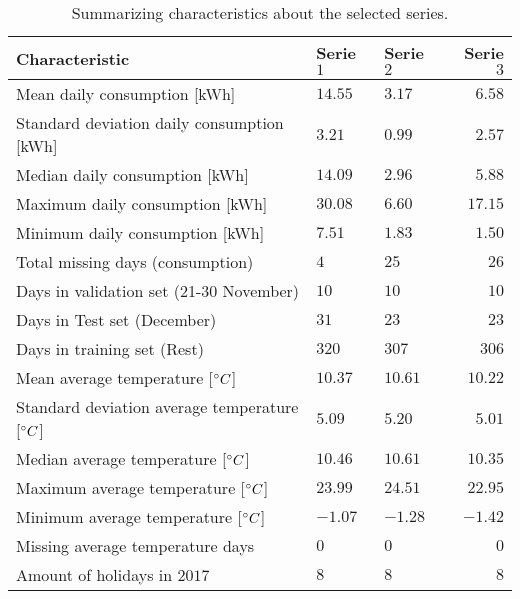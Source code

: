 \begin{table}
  \centering
  \begin{tabular}{@{}l|llr@{}} \toprule
  	\textbf{Characteristic}	& \textbf{Serie $ 1 $} & \textbf{Serie $ 2 $} & \textbf{Serie $ 3 $}\\\midrule
    Mean daily consumption [kWh]& $ 14.55 $&$ 3.17 $  & $ 6.58 $ \\
    Standard deviation daily consumption [kWh] &$ 3.21 $ & $ 0.99 $& $ 2.57 $ \\
    Median daily consumption [kWh] & $ 14.09 $ & $ 2.96 $& $ 5.88 $ \\
    Maximum daily consumption [kWh] & $ 30.08 $ & $ 6.60 $ &  $ 17.15 $   \\
    Minimum daily consumption [kWh]& $ 7.51 $ & $ 1.83 $ &  $ 1.50 $   \\
    Total missing days (consumption) & $ 4 $ &$ 25 $ & $ 26 $\\
    Days in validation set (21-30 November)&  $ 10 $ & $ 10 $  & $ 10 $ \\
    Days in Test set (December) & $ 31 $    &    $ 23 $  & $ 23 $ \\
    Days in training set (Rest)&   $ 320 $  &  $ 307 $   &  $ 306 $\\
    Mean average temperature [$\degree C$]& $ 10.37 $  &  $ 10.61 $  & $ 10.22 $ \\
    Standard deviation average temperature [$\degree C$]& $ 5.09 $  & $ 5.20 $   & $ 5.01 $ \\
    Median average temperature [$\degree C$] &  $ 10.46 $ &  $ 10.61 $  & $ 10.35 $ \\
    Maximum average temperature [$\degree C$] & $ 23.99 $  & $ 24.51 $   & $ 22.95 $ \\ 
    Minimum average temperature [$\degree C$] & $ -1.07 $  &  $ -1.28 $  & $ -1.42 $ \\
    Missing average temperature days &  $ 0 $ & $ 0 $  & $ 0 $  \\ 
    Amount of holidays in $ 2017 $ & $ 8 $  &  $ 8 $  & $ 8 $ \\\bottomrule
  \end{tabular}
  \caption{Summarizing characteristics about the selected series.}
  \label{tab:summ_data}
\end{table}

